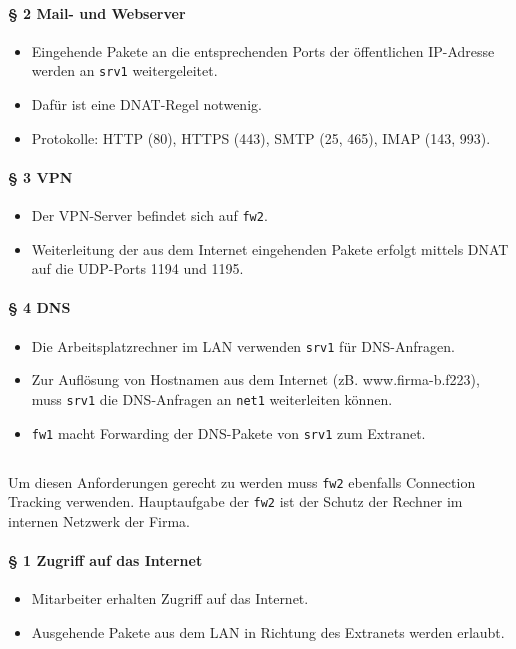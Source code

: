 \paragraph{§ 2 Mail- und Webserver}
\begin{itemize}
\item Eingehende Pakete an die entsprechenden Ports der öffentlichen IP-Adresse werden an {\tt srv1} weitergeleitet.
\item Dafür ist eine DNAT-Regel notwenig.
\item Protokolle: HTTP (80), HTTPS (443), SMTP (25, 465), IMAP (143, 993).
\end{itemize}

\paragraph{§ 3 VPN}
\begin{itemize}
\item Der VPN-Server befindet sich auf {\tt fw2}.
\item Weiterleitung der aus dem Internet eingehenden Pakete erfolgt mittels DNAT auf die UDP-Ports 1194 und 1195.
\end{itemize}

\paragraph{§ 4 DNS}
\begin{itemize}
\item Die Arbeitsplatzrechner im LAN verwenden {\tt srv1} für DNS-Anfragen.
\item Zur Auflösung von Hostnamen aus dem Internet (zB. www.firma-b.f223), muss {\tt srv1} die DNS-Anfragen an {\tt net1} weiterleiten können.
\item {\tt fw1} macht Forwarding der DNS-Pakete von {\tt srv1} zum Extranet.
\end{itemize}

\subsection{\fwb}

Um diesen Anforderungen gerecht zu werden
muss {\tt fw2} ebenfalls Connection Tracking verwenden.
Hauptaufgabe der {\tt fw2} ist der Schutz der Rechner im internen Netzwerk
der Firma.

\paragraph{§ 1 Zugriff auf das Internet}
\begin{itemize}
\item Mitarbeiter erhalten Zugriff auf das Internet.
\item Ausgehende Pakete aus dem LAN in Richtung des Extranets werden erlaubt.
\end{itemize}

